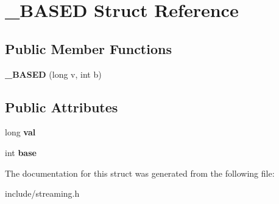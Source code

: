 \hypertarget{struct__BASED}{}\section{\+\_\+\+B\+A\+S\+ED Struct Reference}
\label{struct__BASED}
\subsection*{Public Member Functions}
\begin{DoxyCompactItemize}
\item 
\mbox{\label{struct__BASED_ad245ef70c87f1b0680451c69e84d9a86}} 
{\bfseries \+\_\+\+B\+A\+S\+ED} (long v, int b)
\end{DoxyCompactItemize}
\subsection*{Public Attributes}
\begin{DoxyCompactItemize}
\item 
\mbox{\label{struct__BASED_a9aa9980a497acaa8856a0d0572f13191}} 
long {\bfseries val}
\item 
\mbox{\label{struct__BASED_a2d2f682a027ec75d3c5c3e365d9325f0}} 
int {\bfseries base}
\end{DoxyCompactItemize}


The documentation for this struct was generated from the following file\+:\begin{DoxyCompactItemize}
\item 
include/streaming.\+h\end{DoxyCompactItemize}
